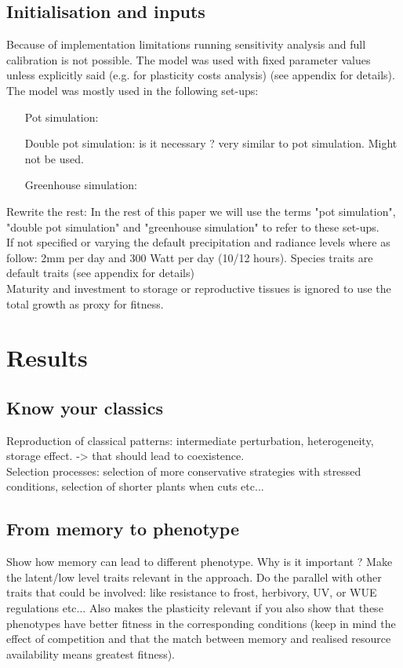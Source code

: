 \documentclass[review]{elsarticle}
\begin{document}
\subsection{Initialisation and inputs}
Because of implementation limitations running sensitivity analysis and full calibration is not possible. The model was used with fixed parameter values unless explicitly said (e.g. for plasticity costs analysis) (see appendix for details). The model was mostly used in the following set-ups:
\begin{itemize}
\item[Pot simulation:]
\item[Double pot simulation:] is it necessary ? very similar to pot simulation. Might not be used.
\item[Greenhouse simulation:]
\end{itemize}

Rewrite the rest:
In the rest of this paper we will use the terms "pot simulation", "double pot simulation" and "greenhouse simulation" to refer  to these set-ups.\\
If not specified or varying the default precipitation and radiance levels where as follow: 2mm per day and 300 Watt per day (10/12 hours). Species traits are default traits (see appendix for details)\\
Maturity and investment to storage or reproductive tissues is ignored to use the total growth as proxy for fitness.


\section{Results}
\subsection{Know your classics}
Reproduction of classical patterns: intermediate perturbation, heterogeneity, storage effect.
-> that should lead to coexistence.\\
Selection processes: selection of more conservative strategies with stressed conditions, selection of  shorter plants when cuts etc...
\subsection{From memory to phenotype}
Show how memory can lead to different phenotype. Why is it important ? Make the latent/low level traits relevant in the approach. Do the parallel with other traits that could be involved: like resistance to frost, herbivory, UV, or WUE regulations etc... Also makes the plasticity relevant if you also show that these phenotypes have better fitness in the corresponding conditions (keep in mind the effect of competition and that the match between memory and realised resource availability means greatest fitness).
\end{document}
